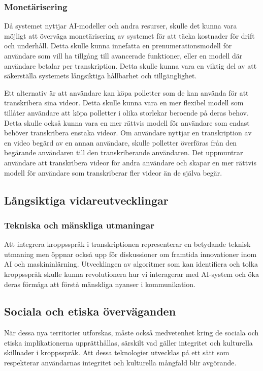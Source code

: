 \subsubsection{Monetärisering}
Då systemet nyttjar AI-modeller och andra resurser, skulle det kunna vara
möjligt att överväga monetärisering av systemet för att täcka kostnader för
drift och underhåll. Detta skulle kunna innefatta en prenumerationsmodell för
användare som vill ha tillgång till avancerade funktioner, eller en modell
där användare betalar per transkription. Detta skulle kunna vara en viktig del
av att säkerställa systemets långsiktiga hållbarhet och tillgänglighet.

Ett alternativ är att användare kan köpa polletter som de kan använda för att
transkribera sina videor. Detta skulle kunna vara en mer flexibel modell som
tillåter användare att köpa polletter i olika storlekar beroende på deras
behov. Detta skulle också kunna vara en mer rättvis modell för användare som
endast behöver transkribera enstaka videor. Om användare nyttjar en
transkription av en video begärd av en annan användare, skulle polletter
överföras från den begärande användaren till den transkriberande användaren.
Det uppmuntrar användare att transkribera videor för andra användare och
skapar en mer rättvis modell för användare som transkriberar fler videor än de
själva begär.

\subsection{Långsiktiga vidareutvecklingar}

\subsubsection{Tekniska och mänskliga utmaningar}
Att integrera kroppsspråk i transkriptionen representerar en betydande teknisk
utmaning men öppnar också upp för diskussioner om framtida innovationer inom
AI och maskininlärning. Utvecklingen av algoritmer som kan identifiera och
tolka kroppsspråk skulle kunna revolutionera hur vi interagerar med AI-system
och öka deras förmåga att förstå mänskliga nyanser i kommunikation.

\subsection{Sociala och etiska överväganden}
När dessa nya territorier utforskas, måste också medvetenhet kring de sociala och etiska implikationerna upprätthållas, särskilt vad gäller integritet och kulturella skillnader i kroppsspråk. Att dessa teknologier utvecklas på ett sätt som respekterar användarnas integritet och kulturella mångfald blir avgörande.
